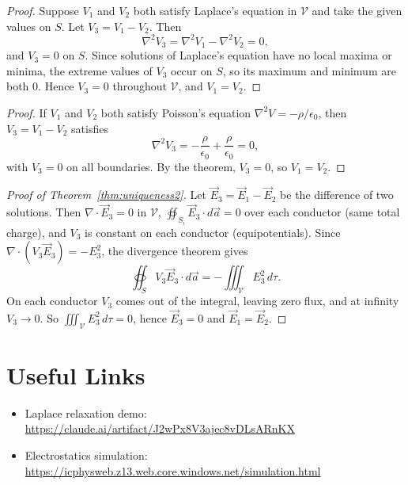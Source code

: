 \documentclass{article}
\begin{document}
\label{app:uniqueness}
\begin{proof}
    Suppose $V_1$ and $V_2$ both satisfy Laplace's equation in $\mathcal{V}$ and take the given values on $S$. Let $V_3 = V_1 - V_2$. Then
    \[\nabla^2 V_3 = \nabla^2 V_1 - \nabla^2 V_2 = 0,\]
    and $V_3 = 0$ on $S$. Since solutions of Laplace's equation have no local maxima or minima, the extreme values of $V_3$ occur on $S$, so its maximum and minimum are both $0$. Hence $V_3 = 0$ throughout $\mathcal{V}$, and $V_1 = V_2$.
\end{proof}
\begin{proof}
    If $V_1$ and $V_2$ both satisfy Poisson's equation $\nabla^2 V = -\rho/\epsilon_0$, then $V_3 = V_1 - V_2$ satisfies
    \[\nabla^2 V_3 = -\frac{\rho}{\epsilon_0} + \frac{\rho}{\epsilon_0} = 0,\]
    with $V_3 = 0$ on all boundaries. By the theorem, $V_3 = 0$, so $V_1 = V_2$.
\end{proof}
\begin{proof}[Proof of Theorem~\ref{thm:uniqueness2}]
    Let $\vec{E}_3 = \vec{E}_1 - \vec{E}_2$ be the difference of two solutions. Then $\nabla\cdot\vec{E}_3 = 0$ in $\mathcal{V}$, $\oiint_{S_i}\vec{E}_3\cdot d\vec{a} = 0$ over each conductor (same total charge), and $V_3$ is constant on each conductor (equipotentials). Since $\nabla\cdot(V_3\vec{E}_3) = -E_3^2$, the divergence theorem gives
    \[\oiint_S V_3\vec{E}_3\cdot d\vec{a} = -\iiint_{\mathcal{V}} E_3^2\,d\tau.\]
    On each conductor $V_3$ comes out of the integral, leaving zero flux, and at infinity $V_3 \to 0$. So $\iiint_{\mathcal{V}} E_3^2\,d\tau = 0$, hence $\vec{E}_3 = 0$ and $\vec{E}_1 = \vec{E}_2$.
\end{proof}


\section{Useful Links}
\begin{itemize}
    \item Laplace relaxation demo:\\ \url{https://claude.ai/artifact/J2wPx8V3ajec8vDLsARnKX}
    \item Electrostatics simulation:\\ \url{https://icphysweb.z13.web.core.windows.net/simulation.html}
\end{itemize}
\end{document}
